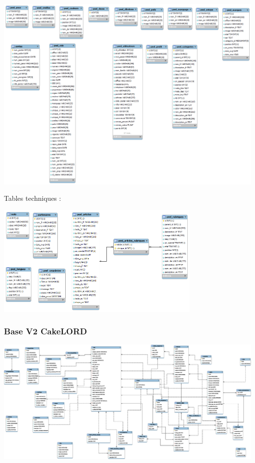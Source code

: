 \documentclass[a4paper,10pt]{article}
\begin{document}
\begin{center}\includegraphics[width=\textwidth]{LORDv1_Tables_fonctionnelles.png}\end{center}

Tables techniques :

\begin{center}\includegraphics[width=0.75\textwidth]{LORDv1_Tables_techniques.png}\end{center}


\begin{landscape}
\subsubsection{Base V2 CakeLORD}
\label{app:dbv2}
\noindent\includegraphics[width=\linewidth]{cakelord.eps}
\end{landscape}
\end{document}
